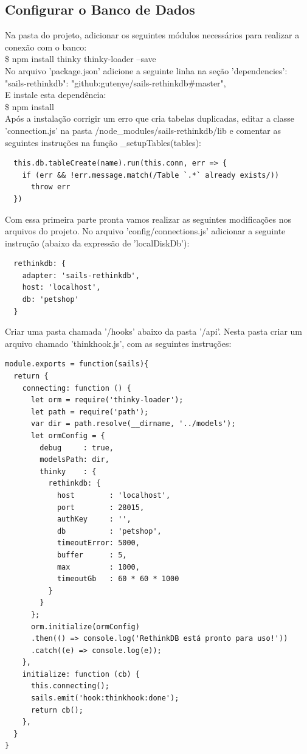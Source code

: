 \documentclass[a4paper,11pt]{article}
\begin{document}
\subsection{Configurar o Banco de Dados}
Na pasta do projeto, adicionar os seguintes módulos necessários para realizar a conexão com o banco: \\[1mm]
{\ttfamily\$ npm install thinky thinky-loader --save} \\[3mm]
No arquivo 'package.json' adicione a seguinte linha na seção 'dependencies': \\[1mm]
{\ttfamily "sails-rethinkdb": "github:gutenye/sails-rethinkdb\#master",} \\[3mm]
E instale esta dependência: \\[1mm]
{\ttfamily\$ npm install} \\[3mm]
Após a instalação corrigir um erro que cria tabelas duplicadas, editar a classe 'connection.js' na pasta /node\_modules/sails-rethinkdb/lib e comentar as seguintes instruções na função \_setupTables(tables):
\begin{lstlisting}
  this.db.tableCreate(name).run(this.conn, err => {
    if (err && !err.message.match(/Table `.*` already exists/))
      throw err
  })
\end{lstlisting}
Com essa primeira parte pronta vamos realizar as seguintes modificações nos arquivos do projeto. No arquivo 'config/connections.js' adicionar a seguinte instrução (abaixo da expressão de 'localDiskDb'):
\begin{lstlisting}
  rethinkdb: {
    adapter: 'sails-rethinkdb',
    host: 'localhost',
    db: 'petshop'
  }
\end{lstlisting}
Criar uma pasta chamada '/hooks' abaixo da pasta '/api'. Nesta pasta criar um arquivo chamado 'thinkhook.js', com as seguintes instruções:
\begin{lstlisting}
module.exports = function(sails){
  return {
    connecting: function () {
      let orm = require('thinky-loader');
      let path = require('path');
      var dir = path.resolve(__dirname, '../models');
      let ormConfig = {
        debug     : true, 
        modelsPath: dir,
        thinky    : {
          rethinkdb: {
            host        : 'localhost',
            port        : 28015,
            authKey     : '',
            db          : 'petshop',
            timeoutError: 5000,
            buffer      : 5,
            max         : 1000,
            timeoutGb   : 60 * 60 * 1000
          }
        }
      };
      orm.initialize(ormConfig)
      .then(() => console.log('RethinkDB está pronto para uso!'))
      .catch((e) => console.log(e));
    },
    initialize: function (cb) {
      this.connecting();
      sails.emit('hook:thinkhook:done');
      return cb();
    },
  }
}  
\end{lstlisting}
\end{document}
